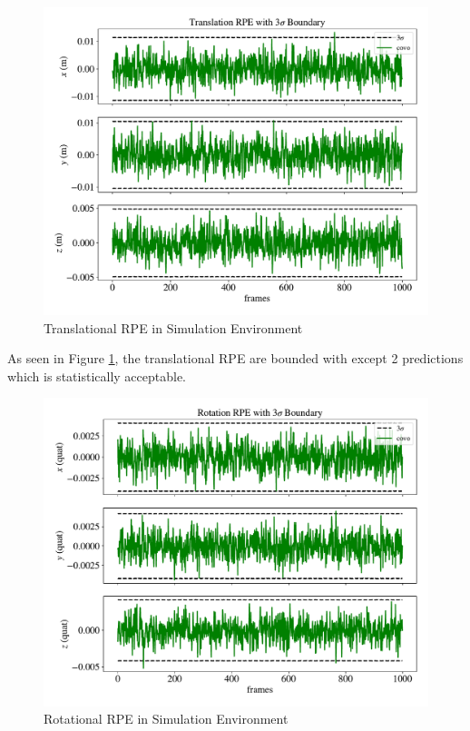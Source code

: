 \documentclass[12pt]{report}
\numberwithin{figure}{section}
\begin{document}
\begin{figure}[H]
  \centering
  \includegraphics[width=0.8\linewidth,natwidth=640,natheight=640]
  {fig/eva_graphs/synt_trans_rpe_3sigma.pdf}
  \caption{Translational RPE in Simulation Environment}
  \label{fig:synt_trans_rpe_3sigma}
\end{figure}

As seen in Figure \ref{fig:synt_trans_rpe_3sigma}, the translational RPE 
are bounded with except 2 predictions which is statistically 
acceptable. 

\begin{figure}[H]
  \centering
  \includegraphics[width=0.8\linewidth,natwidth=640,natheight=640]
  {fig/eva_graphs/synt_rot_rpe_3sigma.pdf}
  \caption{Rotational RPE in Simulation Environment}
	\label{fig:synt_rot_rpe_3sigma}
\end{figure}
\end{document}
